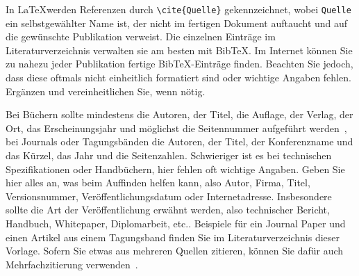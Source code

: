 \documentclass[final,bibliography=totocnumbered]{include/sikseminar}
\begin{document}
        In \LaTeX werden Referenzen durch \verb+\cite{Quelle}+ gekennzeichnet, wobei \verb+Quelle+ ein selbstgewählter Name ist, der nicht im fertigen Dokument auftaucht und auf die \mbox{gewünschte} Publikation verweist. Die einzelnen Einträge im Literaturverzeichnis verwalten sie am besten mit Bib\TeX. Im Internet können Sie zu nahezu jeder Publikation fertige Bib\TeX-Einträge finden. Beachten Sie jedoch, dass diese oftmals nicht einheitlich formatiert sind oder wichtige Angaben fehlen. Ergänzen und vereinheitlichen Sie, wenn nötig.

        Bei Büchern  sollte mindestens die Autoren, der Titel, die Auflage, der Verlag, der Ort, das Erscheinungsjahr und möglichst die Seitennummer aufgeführt werden~\cite[S. 69]{lamport94latex}, bei Journals oder Tagungsbänden die Autoren, der Titel, der Konferenzname und das Kürzel, das Jahr und die Seitenzahlen. Schwieriger ist es bei technischen Spezifikationen oder Handbüchern, hier fehlen oft wichtige Angaben. Geben Sie hier alles an, was beim Auffinden helfen kann, also Autor, Firma, Titel, Versionsnummer, Veröffentlichungsdatum oder Internetadresse. Insbesondere sollte die Art der Veröffentlichung erwähnt werden, also technischer Bericht, Handbuch, Whitepaper, Diplomarbeit, etc.. Beispiele für ein Journal Paper \cite{ungerer2010merasa} und einen Artikel aus einem Tagungsband \cite{ungerer2013parmerasa} finden Sie im Literaturverzeichnis dieser Vorlage. Sofern Sie etwas aus mehreren Quellen zitieren, können Sie dafür auch Mehrfachzitierung verwenden~\cite{ungerer2010merasa,ungerer2013parmerasa}.
\end{document}
